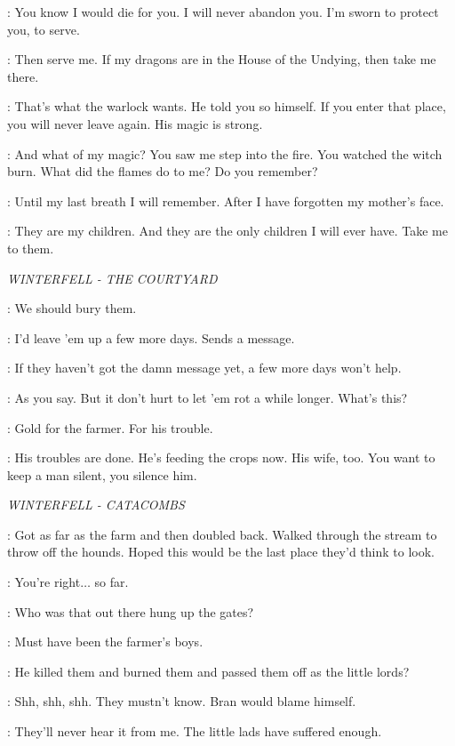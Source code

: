 \JORAH: You know I would die for you. I will never abandon you. I'm sworn to protect you, to serve. 

\DAENERYS: Then serve me. If my dragons are in the House of the Undying, then take me there. 

\JORAH: That's what the warlock wants. He told you so himself. If you enter that place, you will never leave again. His magic is strong. 

\DAENERYS: And what of my magic? You saw me step into the fire. You watched the witch burn. What did the flames do to me? Do you remember? 

\JORAH: Until my last breath I will remember. After I have forgotten my mother's face. 

\DAENERYS: They are my children. And they are the only children I will ever have. Take me to them. 

\scene

\textit{WINTERFELL - THE COURTYARD} 


\THEON: We should bury them. 

\DAGMER: I'd leave 'em up a few more days. Sends a message. 

\THEON: If they haven't got the damn message yet, a few more days won't help. 

\DAGMER: As you say. But it don't hurt to let 'em rot a while longer. What's this? 

\THEON: Gold for the farmer. For his trouble. 

\DAGMER: His troubles are done. He's feeding the crops now. His wife, too. You want to keep a man silent, you silence him. 



\scene

\textit{WINTERFELL - CATACOMBS} 


\OSHA: Got as far as the farm and then doubled back. Walked through the stream to throw off the hounds. Hoped this would be the last place they'd think to look. 

\LUWIN: You're right$\ldots$ so far. 

\OSHA: Who was that out there hung up the gates? 

\LUWIN: Must have been the farmer's boys. 

\OSHA: He killed them and burned them and passed them off as the little lords? 

\LUWIN: Shh, shh, shh. They mustn't know. Bran would blame himself. 

\OSHA: They'll never hear it from me. The little lads have suffered enough. 


